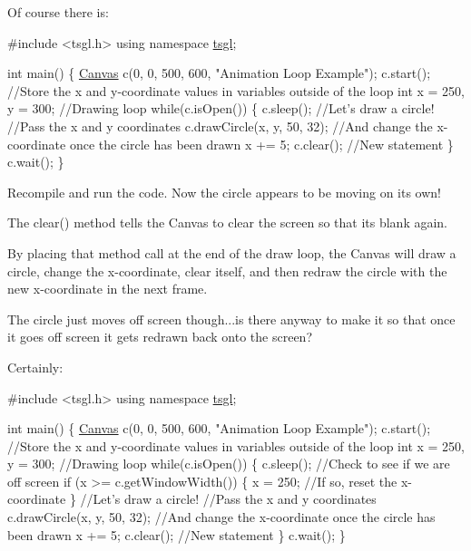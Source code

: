 Of course there is\+:


\begin{DoxyCode}
\textcolor{preprocessor}{#include <tsgl.h>}
\textcolor{keyword}{using namespace }\hyperlink{namespacetsgl}{tsgl};

\textcolor{keywordtype}{int} main() \{
  \hyperlink{classtsgl_1_1_canvas}{Canvas} c(0, 0, 500, 600, \textcolor{stringliteral}{"Animation Loop Example"});
  c.start();
  \textcolor{comment}{//Store the x and y-coordinate values in variables outside of the loop}
  \textcolor{keywordtype}{int} x = 250, y = 300;
  \textcolor{comment}{//Drawing loop}
  \textcolor{keywordflow}{while}(c.isOpen()) \{
    c.sleep();
    \textcolor{comment}{//Let's draw a circle!}
    \textcolor{comment}{//Pass the x and y coordinates}
    c.drawCircle(x, y, 50, 32);
    \textcolor{comment}{//And change the x-coordinate once the circle has been drawn}
    x += 5;
    c.clear(); \textcolor{comment}{//New statement}
  \}
  c.wait();
\}
\end{DoxyCode}


Recompile and run the code. Now the circle appears to be moving on its own!

The clear() method tells the Canvas to clear the screen so that its blank again.

By placing that method call at the end of the draw loop, the Canvas will draw a circle, change the x-\/coordinate, clear itself, and then redraw the circle with the new x-\/coordinate in the next frame.

The circle just moves off screen though...is there anyway to make it so that once it goes off screen it gets redrawn back onto the screen?

Certainly\+:


\begin{DoxyCode}
\textcolor{preprocessor}{#include <tsgl.h>}
\textcolor{keyword}{using namespace }\hyperlink{namespacetsgl}{tsgl};

\textcolor{keywordtype}{int} main() \{
  \hyperlink{classtsgl_1_1_canvas}{Canvas} c(0, 0, 500, 600, \textcolor{stringliteral}{"Animation Loop Example"});
  c.start();
  \textcolor{comment}{//Store the x and y-coordinate values in variables outside of the loop}
  \textcolor{keywordtype}{int} x = 250, y = 300;
  \textcolor{comment}{//Drawing loop}
  \textcolor{keywordflow}{while}(c.isOpen()) \{
    c.sleep();
    \textcolor{comment}{//Check to see if we are off screen}
    \textcolor{keywordflow}{if} (x >= c.getWindowWidth()) \{
       x = 250; \textcolor{comment}{//If so, reset the x-coordinate}
    \}
    \textcolor{comment}{//Let's draw a circle!}
    \textcolor{comment}{//Pass the x and y coordinates}
    c.drawCircle(x, y, 50, 32);
    \textcolor{comment}{//And change the x-coordinate once the circle has been drawn}
    x += 5;
    c.clear(); \textcolor{comment}{//New statement}
  \}
  c.wait();
\}
\end{DoxyCode}



